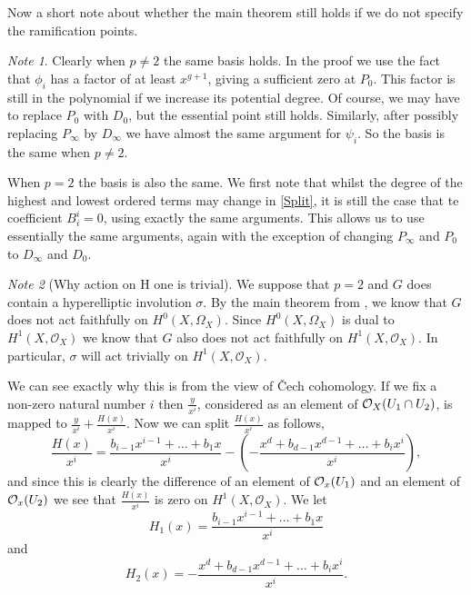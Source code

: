 \documentclass[draft, 11pt]{article} %
\theoremstyle{plain}
\theoremstyle{remark}
\newtheorem*{note}{Note}
\newcommand{\cO}{{\cal O}}
\newcommand{\cech}{\v{C}ech }
\newcommand{\hzero}{{H^0(X,\Omega_X)}}
\newcommand{\hone}{H^1(X,\mathcal{O}_X)}
\begin{document}
Now a short note about whether the main theorem still holds if we do not specify the ramification points.
\begin{note}
Clearly when $p\neq 2$ the same basis holds. In the proof we use the fact that $\phi_i$ has a factor of at least $x^{g+1}$, giving a sufficient zero at $P_0$.
This factor is still in the polynomial if we increase its potential degree.
Of course, we may have to replace $P_0$ with $D_0$, but the essential point still holds.
Similarly, after possibly replacing $P_\infty$ by $D_\infty$ we have almost the same argument for $\psi_i$.
So the basis is the same when $p\neq2$.

When $p=2$ the basis is also the same.
We first note that whilst the degree of the highest and lowest ordered terms may change in \eqref{Split}, it is still the case that te coefficient $B_i^i =0$, using exactly the same arguments.
This allows us to use essentially the same arguments, again with the exception of changing $P_\infty$ and $P_0$ to $D_\infty$ and $D_0$.
\end{note}

\begin{note}[Why action on H one is trivial]
We suppose that $p=2$ and $G$ does contain a hyperelliptic involution $\sigma$.
By the main theorem from \cite{faithfulaction}, we know that $G$ does not act faithfully on $\hzero$.
Since $\hzero$ is dual to $\hone$ we know that $G$ also does not act faithfully on $\hone$.
In particular, $\sigma$ will act trivially on $\hone$.

We can see exactly why this is from the view of \cech cohomology.
If we fix a non-zero natural number $i$ then $\frac{y}{x^i}$, considered as an element of $\cO_X(U_1\cap U_2)$, is mapped to $\frac{y}{x^i} + \frac{H(x)}{x^i}$. 
Now we can split $\frac{H(x)}{x^i}$ as follows, 
\begin{equation*}
\frac{H(x)}{x^i} =  \frac{b_{i-1}x^{i-1} + \ldots + b_1x}{x^i} - \left( - \frac{x^d + b_{d-1}x^{d-1} + \ldots + b_ix^i}{x^i} \right),
\end{equation*}
and since this is clearly the difference of an element of $\cO_x(U_1)$ and an element of $\cO_x(U_2)$ we see that $\frac{H(x)}{x^i}$ is zero on $\hone$.
We let 
\[
H_1(x) = \frac{b_{i-1}x^{i-1} + \ldots + b_1x}{x^i}
\]
and 
\[
H_2(x) = - \frac{x^d + b_{d-1}x^{d-1} + \ldots + b_ix^i}{x^i}.
\]
\end{note}




\end{document}
